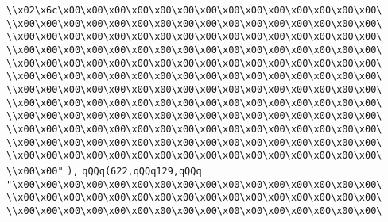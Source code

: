\verb|\\x02\x6c\x00\x00\x00\x00\x00\x00\x00\x00\x00\x00\x00\x00\x00\x00\|\newline
\verb|\\x00\x00\x00\x00\x00\x00\x00\x00\x00\x00\x00\x00\x00\x00\x00\x00\|\newline
\verb|\\x00\x00\x00\x00\x00\x00\x00\x00\x00\x00\x00\x00\x00\x00\x00\x00\|\newline
\verb|\\x00\x00\x00\x00\x00\x00\x00\x00\x00\x00\x00\x00\x00\x00\x00\x00\|\newline
\verb|\\x00\x00\x00\x00\x00\x00\x00\x00\x00\x00\x00\x00\x00\x00\x00\x00\|\newline
\verb|\\x00\x00\x00\x00\x00\x00\x00\x00\x00\x00\x00\x00\x00\x00\x00\x00\|\newline
\verb|\\x00\x00\x00\x00\x00\x00\x00\x00\x00\x00\x00\x00\x00\x00\x00\x00\|\newline
\verb|\\x00\x00\x00\x00\x00\x00\x00\x00\x00\x00\x00\x00\x00\x00\x00\x00\|\newline
\verb|\\x00\x00\x00\x00\x00\x00\x00\x00\x00\x00\x00\x00\x00\x00\x00\x00\|\newline
\verb|\\x00\x00\x00\x00\x00\x00\x00\x00\x00\x00\x00\x00\x00\x00\x00\x00\|\newline
\verb|\\x00\x00\x00\x00\x00\x00\x00\x00\x00\x00\x00\x00\x00\x00\x00\x00\|\newline
\verb|\\x00\x00\x00\x00\x00\x00\x00\x00\x00\x00\x00\x00\x00\x00\x00\x00\|\newline
\verb|\\x00\x00"|\newline
\verb|),|\newline
\verb|qQQq(622,qQQq129,qQQq|\newline
\verb|"\x00\x00\x00\x00\x00\x00\x00\x00\x00\x00\x00\x00\x00\x00\x00\x00\|\newline
\verb|\\x00\x00\x00\x00\x00\x00\x00\x00\x00\x00\x00\x00\x00\x00\x00\x00\|\newline
\verb|\\x00\x00\x00\x00\x00\x00\x00\x00\x00\x00\x00\x00\x00\x00\x00\x00\|\newline
